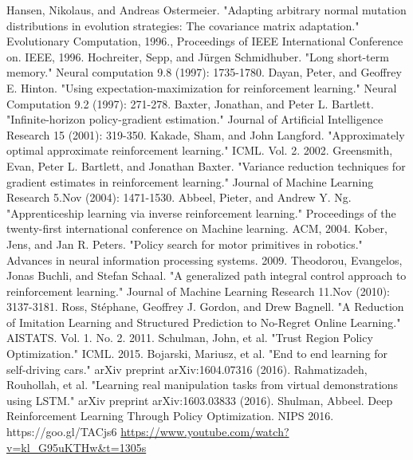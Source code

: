 \documentclass[11pt]{article}
\begin{document}
\begin{thebibliography}{8}
Hansen, Nikolaus, and Andreas Ostermeier. "Adapting arbitrary normal mutation distributions in evolution strategies: The covariance matrix adaptation." Evolutionary Computation, 1996., Proceedings of IEEE International Conference on. IEEE, 1996.
Hochreiter, Sepp, and Jürgen Schmidhuber. "Long short-term memory." Neural computation 9.8 (1997): 1735-1780.
Dayan, Peter, and Geoffrey E. Hinton. "Using expectation-maximization for reinforcement learning." Neural Computation 9.2 (1997): 271-278.
Baxter, Jonathan, and Peter L. Bartlett. "Infinite-horizon policy-gradient estimation." Journal of Artificial Intelligence Research 15 (2001): 319-350.
Kakade, Sham, and John Langford. "Approximately optimal approximate reinforcement learning." ICML. Vol. 2. 2002.
Greensmith, Evan, Peter L. Bartlett, and Jonathan Baxter. "Variance reduction techniques for gradient estimates in reinforcement learning." Journal of Machine Learning Research 5.Nov (2004): 1471-1530.
Abbeel, Pieter, and Andrew Y. Ng. "Apprenticeship learning via inverse reinforcement learning." Proceedings of the twenty-first international conference on Machine learning. ACM, 2004.
Kober, Jens, and Jan R. Peters. "Policy search for motor primitives in robotics." Advances in neural information processing systems. 2009.
Theodorou, Evangelos, Jonas Buchli, and Stefan Schaal. "A generalized path integral control approach to reinforcement learning." Journal of Machine Learning Research 11.Nov (2010): 3137-3181.
Ross, Stéphane, Geoffrey J. Gordon, and Drew Bagnell. "A Reduction of Imitation Learning and Structured Prediction to No-Regret Online Learning." AISTATS. Vol. 1. No. 2. 2011.
Schulman, John, et al. "Trust Region Policy Optimization." ICML. 2015.
Bojarski, Mariusz, et al. "End to end learning for self-driving cars." arXiv preprint arXiv:1604.07316 (2016).
Rahmatizadeh, Rouhollah, et al. "Learning real manipulation tasks from virtual demonstrations using LSTM." arXiv preprint arXiv:1603.03833 (2016).
Shulman, Abbeel. Deep Reinforcement Learning Through Policy Optimization. NIPS 2016. https://goo.gl/TACjs6
\url{https://www.youtube.com/watch?v=kl_G95uKTHw&t=1305s}
\end{thebibliography}
\end{document}
